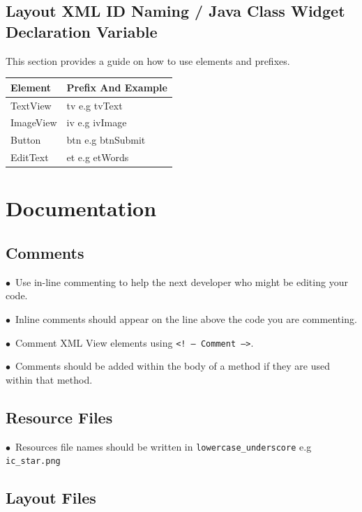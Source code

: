 \documentclass[english]{article}
\begin{document}
\subsection{Layout XML ID Naming / Java Class Widget Declaration Variable}
				
This section provides a guide on how to use elements and prefixes.
				\\
				\begin{tabular}{ |p{3cm}|p{9cm}|  }
				\hline
				\textbf{Element} & \textbf{Prefix And Example}  \\
				\hline
				TextView &	tv	e.g tvText\\
				\hline
				ImageView &	iv	e.g ivImage\\
				\hline
				Button &	btn	e.g btnSubmit\\
				\hline
				EditText &	et	e.g etWords \\
				\hline
				\end{tabular}

\section{Documentation}

\subsection{Comments}
$\bullet$\ Use in-line commenting to help the next developer who might be editing your code.\par
$\bullet$\ Inline comments should appear on the line above the code you are commenting.\par
$\bullet$\ Comment XML View elements using  \texttt{<! -- Comment -->}.\par
$\bullet$\ Comments should be added within the body of a method if they are used within that method.\par



\subsection{Resource Files}
$\bullet$\ Resources file names should be written in  \texttt{lowercase\_underscore}  e.g  \texttt{ic\_star.png} \par


\subsection{Layout Files}
\end{document}
